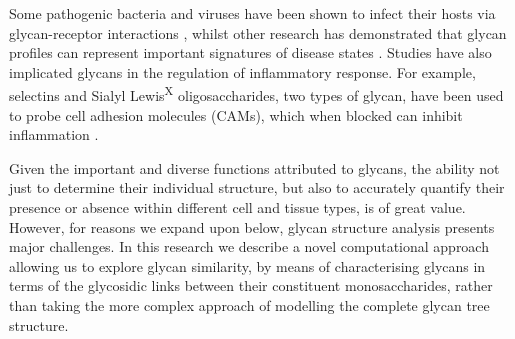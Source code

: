 \documentclass[12pt,a4paper]{article}
\begin{document}
Some pathogenic bacteria and viruses have been shown to infect their hosts via glycan-receptor interactions \citep{cossart2004bacterial, sacks2001molecular}, whilst other research has demonstrated that glycan profiles can represent important signatures of disease states \citep{tong2003glycosylation}. Studies have also implicated glycans in the regulation of inflammatory response. For example, selectins and Sialyl Lewis\textsuperscript{X} oligosaccharides, two types of glycan, have been used to probe cell adhesion molecules (CAMs), which when blocked can inhibit inflammation \citep{albelda1994adhesion}.

Given the important and diverse functions attributed to glycans, the ability not just to determine their individual structure, but also to accurately quantify their presence or absence within different cell and tissue types, is of great value. However, for reasons we expand upon below, glycan structure analysis presents major challenges. In this research we describe a novel computational approach allowing us to explore glycan similarity, by means of characterising glycans in terms of the glycosidic links between their constituent monosaccharides, rather than taking the more complex approach of modelling the complete glycan tree structure.




\end{document}
